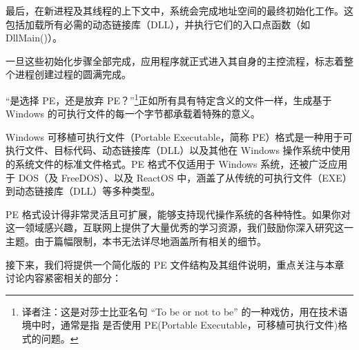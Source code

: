 最后，在新进程及其线程的上下文中，系统会完成地址空间的最终初始化工作。这包括加载所有必需的动态链接库（DLL），并执行它们的入口点函数（如 DllMain()）。

一旦这些初始化步骤全部完成，应用程序就正式进入其自身的主控流程，标志着整个进程创建过程的圆满完成。


“是选择 PE，还是放弃 PE？”\footnote{译者注：这是对莎士比亚名句 “To be or not to be” 的一种戏仿，用在技术语境中时，通常是指 是否使用 PE(Portable Executable，可移植可执行文件)格式的问题。}正如所有具有特定含义的文件一样，生成基于 Windows 的可执行文件的每一个字节都承载着特殊的意义。

Windows 可移植可执行文件（Portable Executable，简称 PE）格式是一种用于可执行文件、目标代码、动态链接库（DLL）以及其他在 Windows 操作系统中使用的系统文件的标准文件格式。PE 格式不仅适用于 Windows 系统，还被广泛应用于 DOS（及 FreeDOS）、以及 ReactOS 中，涵盖了从传统的可执行文件（EXE）到动态链接库（DLL）等多种类型。

PE 格式设计得非常灵活且可扩展，能够支持现代操作系统的各种特性。如果你对这一领域感兴趣，互联网上提供了大量优秀的学习资源，我们鼓励你深入研究这一主题。由于篇幅限制，本书无法详尽地涵盖所有相关的细节。

接下来，我们将提供一个简化版的 PE 文件结构及其组件说明，重点关注与本章讨论内容紧密相关的部分：

